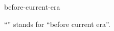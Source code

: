 \documentclass{stex}
\begin{document}
\begin{smodule}{before-current-era}
\begin{sparagraph}[style=symdoc]
``'' stands for ``before current era''.
\end{sparagraph}
\end{smodule}
\end{document}

